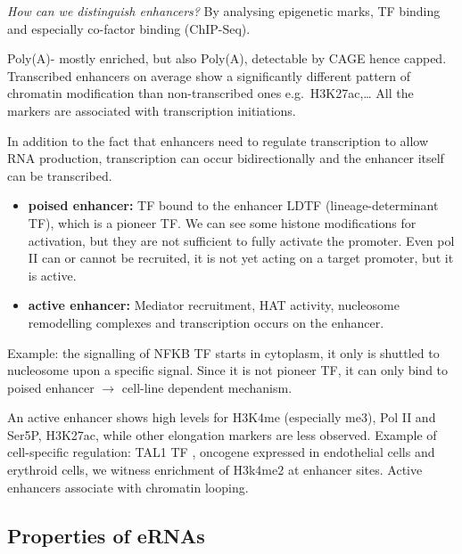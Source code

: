 \emph{How can we distinguish enhancers?} By analysing epigenetic marks, TF binding and especially co-factor binding (ChIP-Seq).

Poly(A)- mostly enriched, but also Poly(A), detectable by CAGE hence capped. Transcribed enhancers on average show a significantly different pattern of chromatin modification than non-transcribed ones e.g.~H3K27ac,\ldots{} All the markers are associated with transcription initiations.

In addition to the fact that enhancers need to regulate transcription to allow RNA production, transcription can occur bidirectionally and the enhancer itself can be transcribed.

\begin{itemize}
\tightlist
\item
  \textbf{poised enhancer:} TF bound to the enhancer LDTF (lineage-determinant TF), which is a pioneer TF. We can see some histone modifications for activation, but they are not sufficient to fully activate the promoter. Even pol II can or cannot be recruited, it is not yet acting on a target promoter, but it is active.
\item
  \textbf{active enhancer:} Mediator recruitment, HAT activity, nucleosome remodelling complexes and transcription occurs on the enhancer.
\end{itemize}

Example: the signalling of NFKB TF starts in cytoplasm, it only is shuttled to nucleosome upon a specific signal. Since it is not pioneer TF, it can only bind to poised enhancer $\rightarrow$ cell-line dependent mechanism.

An active enhancer shows high levels for H3K4me (especially me3), Pol II and Ser5P, H3K27ac, while other elongation markers are less observed. Example of cell-specific regulation: TAL1 TF , oncogene expressed in endothelial cells and erythroid cells, we witness enrichment of H3k4me2 at enhancer sites. Active enhancers associate with chromatin looping.

\hypertarget{properties-of-ernas}{%
\subsection{Properties of eRNAs}\label{properties-of-ernas}}

